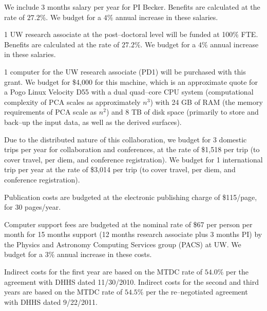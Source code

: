 \bigskip {} We include 3 months salary per year for PI
Becker. Benefits are calculated at the rate of $27.2\%$.  We budget for a $4\%$
annual increase in these salaries.

\bigskip {} 1 UW research associate at the
post--doctoral level will be funded at 100\% FTE.  Benefits are calculated at
the rate of $27.2\%$.  We budget for a $4\%$ annual increase in these salaries.

\bigskip {} 1 computer for the UW research associate
(PD1) will be purchased with this grant. We budget for \$4,000 for this machine,
which is an approximate quote for a Pogo Linux Velocity D55 with a dual
quad--core CPU system (computational complexity of PCA scales as approximately
$n^3$) with 24 GB of RAM (the memory requirements of PCA scale as $n^2$) and 8
TB of disk space (primarily to store and back--up the input data, as well as the
derived surfaces).

\bigskip {} Due to the distributed nature of this
collaboration, we budget for 3 domestic trips per year for collaboration and
conferences, at the rate of \$1,518 per trip (to cover travel, per diem, and
conference registration).  We budget for 1 international trip per year at the
rate of \$3,014 per trip (to cover travel, per diem, and conference
registration).

\bigskip {} Publication costs are budgeted at
the electronic publishing charge of \$115/page, for 30 pages/year.

\bigskip {} Computer support fees are budgeted at
the nominal rate of \$67 per person per month for 15 months support (12 months
research associate plus 3 months PI) by the Physics and Astronomy Computing
Services group (PACS) at UW.  We budget for a $3\%$ annual increase in these
costs.

\bigskip {} Indirect costs for the first year are based on
the MTDC rate of $54.0\%$ per the agreement with DHHS dated 11/30/2010. Indirect
costs for the second and third years are based on the MTDC rate of $54.5\%$ per
the re--negotiated agreement with DHHS dated 9/22/2011.
